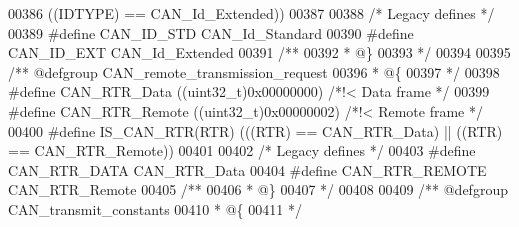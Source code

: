 \begin{DoxyCode}
00386                                \textcolor{preprocessor}{(}\textcolor{preprocessor}{(}\textcolor{preprocessor}{IDTYPE}\textcolor{preprocessor}{)} \textcolor{preprocessor}{==} CAN_Id_Extended\textcolor{preprocessor}{)}\textcolor{preprocessor}{)}
00387 
00388 \textcolor{comment}{/* Legacy defines */}
00389 \textcolor{preprocessor}{#}\textcolor{preprocessor}{define} \textcolor{preprocessor}{CAN\_ID\_STD}      CAN_Id_Standard
00390 \textcolor{preprocessor}{#}\textcolor{preprocessor}{define} \textcolor{preprocessor}{CAN\_ID\_EXT}      CAN_Id_Extended
00391 \textcolor{comment}{/**}
00392 \textcolor{comment}{  * @\}}
00393 \textcolor{comment}{  */}
00394 
00395 \textcolor{comment}{/** @defgroup CAN\_remote\_transmission\_request }
00396 \textcolor{comment}{  * @\{}
00397 \textcolor{comment}{  */}
00398 \textcolor{preprocessor}{#}\textcolor{preprocessor}{define} \textcolor{preprocessor}{CAN\_RTR\_Data}                \textcolor{preprocessor}{(}\textcolor{preprocessor}{(}\textcolor{preprocessor}{uint32\_t}\textcolor{preprocessor}{)}0x00000000\textcolor{preprocessor}{)}  \textcolor{comment}{/*!< Data frame */}
00399 \textcolor{preprocessor}{#}\textcolor{preprocessor}{define} \textcolor{preprocessor}{CAN\_RTR\_Remote}              \textcolor{preprocessor}{(}\textcolor{preprocessor}{(}\textcolor{preprocessor}{uint32\_t}\textcolor{preprocessor}{)}0x00000002\textcolor{preprocessor}{)}  \textcolor{comment}{/*!< Remote frame */}
00400 \textcolor{preprocessor}{#}\textcolor{preprocessor}{define} \textcolor{preprocessor}{IS\_CAN\_RTR}\textcolor{preprocessor}{(}\textcolor{preprocessor}{RTR}\textcolor{preprocessor}{)} \textcolor{preprocessor}{(}\textcolor{preprocessor}{(}\textcolor{preprocessor}{(}\textcolor{preprocessor}{RTR}\textcolor{preprocessor}{)} \textcolor{preprocessor}{==} CAN_RTR_Data\textcolor{preprocessor}{)} \textcolor{preprocessor}{||} \textcolor{preprocessor}{(}\textcolor{preprocessor}{(}\textcolor{preprocessor}{RTR}\textcolor{preprocessor}{)} \textcolor{preprocessor}{==} 
      CAN_RTR_Remote\textcolor{preprocessor}{)}\textcolor{preprocessor}{)}
00401 
00402 \textcolor{comment}{/* Legacy defines */}
00403 \textcolor{preprocessor}{#}\textcolor{preprocessor}{define} \textcolor{preprocessor}{CAN\_RTR\_DATA}     CAN_RTR_Data
00404 \textcolor{preprocessor}{#}\textcolor{preprocessor}{define} \textcolor{preprocessor}{CAN\_RTR\_REMOTE}   CAN_RTR_Remote
00405 \textcolor{comment}{/**}
00406 \textcolor{comment}{  * @\}}
00407 \textcolor{comment}{  */}
00408 
00409 \textcolor{comment}{/** @defgroup CAN\_transmit\_constants }
00410 \textcolor{comment}{  * @\{}
00411 \textcolor{comment}{  */}

\end{DoxyCode}
